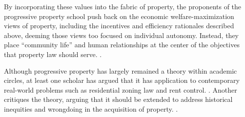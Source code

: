 
By incorporating these values into the fabric of property, the proponents of the
progressive property school push back on the economic welfare-maximization views
of property, including the incentives and efficiency rationales described above,
deeming those views too focused on individual autonomy. Instead, they place
``community life'' and human relationships at the center of the objectives that
property law should serve. .




Although progressive property has largely remained a theory within academic
circles, at least one scholar has argued that it has application to contemporary
real-world problems such as residential zoning law and rent control.
. Another critiques the theory, arguing that
it should be extended to address historical inequities and wrongdoing in the
acquisition of property. .
